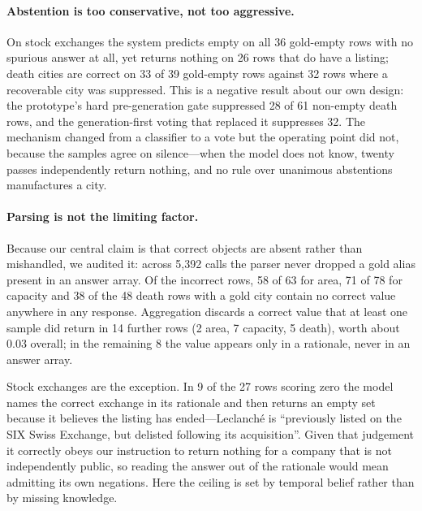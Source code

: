 \documentclass[11pt]{article}
\begin{document}
\paragraph{Abstention is too conservative, not too aggressive.}
On stock exchanges the system predicts empty on all 36 gold-empty rows with no
spurious answer at all, yet returns nothing on 26 rows that do have a listing;
death cities are correct on 33 of 39 gold-empty rows against 32 rows where a
recoverable city was suppressed. This is a negative result about our own design:
the prototype's hard pre-generation gate suppressed 28 of 61 non-empty death
rows, and the generation-first voting that replaced it suppresses 32. The
mechanism changed from a classifier to a vote but the operating point did not,
because the samples agree on silence---when the
model does not know, twenty passes independently return nothing, and no rule
over unanimous abstentions manufactures a city.

\paragraph{Parsing is not the limiting factor.}
Because our central claim is that correct objects are absent rather than
mishandled, we audited it: across 5{,}392 calls the parser never dropped a gold
alias present in an answer array. Of the incorrect rows, 58 of 63 for area, 71
of 78 for capacity and 38 of the 48 death rows with a gold city contain no
correct value anywhere in any response. Aggregation discards a correct value
that at least one sample did return in 14 further rows (2 area, 7 capacity, 5
death), worth about 0.03 overall; in the remaining 8 the value appears only in
a rationale, never in an answer array.

Stock exchanges are the exception. In 9 of the 27 rows scoring zero the model
names the correct exchange in its rationale and then returns an empty set because it
believes the listing has ended---Leclanché is ``previously listed on the SIX
Swiss Exchange, but delisted following its acquisition''. Given that judgement
it correctly obeys our instruction to return nothing for a company that is not
independently public, so reading the answer out of the rationale would mean
admitting its own negations. Here the ceiling is set by temporal belief rather
than by missing knowledge.
\end{document}
